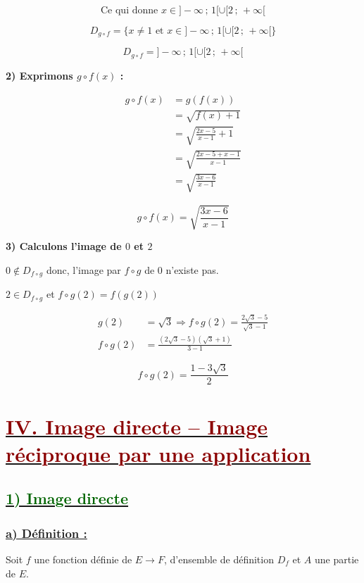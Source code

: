 \documentclass[12pt,a4paper]{article}
\begin{document}
\[
\text{Ce qui donne }x\in]-\infty\,;\,1[\cup[2\,;\,+\infty[
\]

\[
D_{g\circ f}
=
\{x\neq1\text{ et }x\in]-\infty\,;\,1[\cup[2\,;\,+\infty[\}
\]

\[
\boxed{
D_{g\circ f}
=
]-\infty\,;\,1[\cup[2\,;\,+\infty[
}
\]

\textbf{2) Exprimons $g\circ f(x)$ :}

\[
\begin{aligned}
g\circ f(x)
&=g(f(x))\\
&=\sqrt{f(x)+1}\\
&=\sqrt{\frac{2x-5}{x-1}+1}\\
&=\sqrt{\frac{2x-5+x-1}{x-1}}\\
&=\sqrt{\frac{3x-6}{x-1}}
\end{aligned}
\]

\[
\boxed{
g\circ f(x)=\sqrt{\frac{3x-6}{x-1}}
}
\]

\textbf{3) Calculons l'image de $0$ et $2$}

$0\notin D_{f\circ g}$ donc, l'image par $f\circ g$ de $0$ n'existe pas.

$2\in D_{f\circ g}$ et $ f\circ g(2)=f(g(2)) $

\[
\begin{aligned}
g(2)&=\sqrt{3}
\Longrightarrow
f\circ g(2)=\frac{2\sqrt{3}-5}{\sqrt{3}-1}\\
f\circ g(2)
&=\frac{(2\sqrt{3}-5)(\sqrt{3}+1)}
{3-1}
\end{aligned}
\]

\[
\boxed{
f\circ g(2)=\frac{1-3\sqrt{3}}{2}
}
\]

\section*{\underline{\textbf{\textcolor{darkred}{IV. Image directe -- Image réciproque par une application}}}}

\subsection*{\underline{\textbf{\textcolor{darkgreen}{1) Image directe}}}}

\subsubsection*{\underline{\textbf{a) Définition :}}}

Soit $f$ une fonction définie de $E\longrightarrow F$, d'ensemble de définition
$D_f$ et $A$ une partie de $E$.
\end{document}
